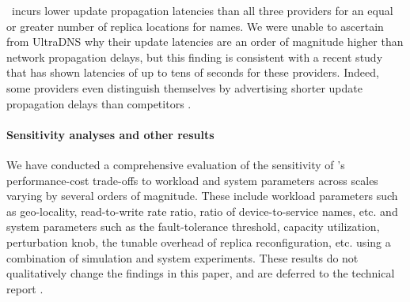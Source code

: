 \auspice\ incurs lower update propagation latencies than all three providers for an equal or greater number of replica locations for names. We were unable to ascertain from UltraDNS why their update latencies are an order of magnitude higher than network propagation delays, but this finding is consistent with a recent study \cite{dnscompare} that has shown latencies of up to tens of seconds for these providers. Indeed, some providers even distinguish themselves by advertising shorter update propagation delays than competitors \cite{dnscompare}.

\vspace{-0.1in}
{\paragraph{Sensitivity analyses and other results}} \label{sec:other} We have conducted a comprehensive evaluation of the sensitivity of \auspice's performance-cost trade-offs to workload and system parameters across scales varying by several orders of magnitude. These include workload parameters such as geo-locality, read-to-write rate ratio, ratio of device-to-service names, etc. and system parameters such as the fault-tolerance threshold, capacity utilization, perturbation knob, the tunable overhead of replica reconfiguration, etc. using a combination of simulation and system experiments. These results do not qualitatively change the findings in this paper, and are deferred to the technical report \cite{techreport}.



